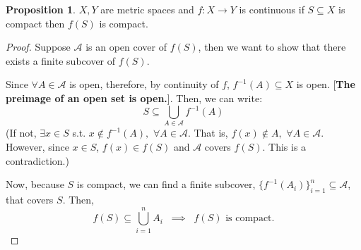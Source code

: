 \documentclass[12pt]{article}
\theoremstyle{definition}
\newtheorem{proposition}[theorem]{Proposition}
\theoremstyle{plain}
\begin{document}
\begin{proposition}
    $X,Y$ are metric spaces and $f: X \to Y$ is continuous if $S \subseteq X$
    is compact then $f(S)$ is compact.
    \begin{proof}
        Suppose $\mathcal A$ is an open cover of $f(S)$, then we want to show
        that there exists a finite subcover of $f(S)$.

        Since $\forall A \in \mathcal A$ is open, therefore, by continuity of
        $f$, $f^{-1}(A) \subseteq X$ is open. [\textbf{The preimage of an open
        set is open.}]. Then, we can write:
        \[
            S \subseteq \bigcup _{A \in \mathcal A} f^{-1}(A)
        \]
        (If not, $\exists x \in S$ s.t. $x \not \in f^{-1}(A), $ $\forall A \in
            \mathcal A$. That is, $f(x) \not \in A, $ $\forall A \in \mathcal
            A$. However, since $x \in S$, $f(x) \in f(S)$ and $\mathcal A$
        covers $f(S)$. This is a contradiction.)

        Now, because $S$ is compact, we can find a finite subcover,
        $\{f^{-1}(A_i)\}_{i=1}^n \subseteq \mathcal A$, that covers $S$. Then,
        \[
            f(S) \subseteq \bigcup_{i=1}^n A_i \;\; \implies \;\; f(S) \text{ is
            compact.}
        \]
    \end{proof}
\end{proposition}
\end{document}
